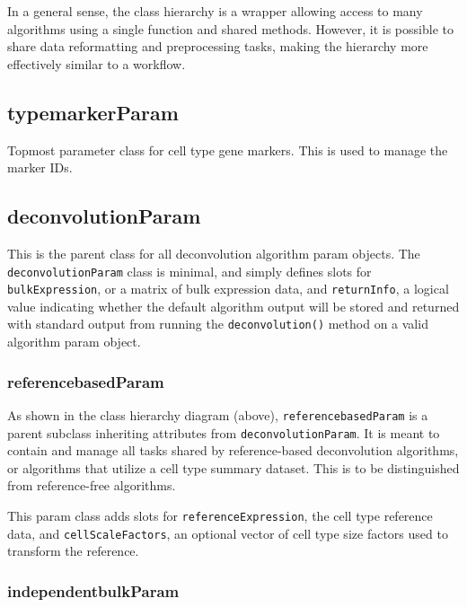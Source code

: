 \documentclass[]{article}
\begin{document}
In a general sense, the class hierarchy is a wrapper allowing access to many
algorithms using a single function and shared methods. However, it is possible
to share data reformatting and preprocessing tasks, making the hierarchy more
effectively similar to a workflow.

\hypertarget{typemarkerparam}{%
\subsection{typemarkerParam}\label{typemarkerparam}}

Topmost parameter class for cell type gene markers. This is used to manage the
marker IDs.

\hypertarget{deconvolutionparam}{%
\subsection{deconvolutionParam}\label{deconvolutionparam}}

This is the parent class for all deconvolution algorithm param objects. The
\texttt{deconvolutionParam} class is minimal, and simply defines slots for
\texttt{bulkExpression}, or a matrix of bulk expression data, and \texttt{returnInfo},
a logical value indicating whether the default algorithm output will be stored
and returned with standard output from running the \texttt{deconvolution()} method on
a valid algorithm param object.

\hypertarget{referencebasedparam}{%
\subsubsection{referencebasedParam}\label{referencebasedparam}}

As shown in the class hierarchy diagram (above), \texttt{referencebasedParam} is a
parent subclass inheriting attributes from \texttt{deconvolutionParam}. It is meant to
contain and manage all tasks shared by reference-based deconvolution algorithms,
or algorithms that utilize a cell type summary dataset. This is to be
distinguished from reference-free algorithms.

This param class adds slots for \texttt{referenceExpression}, the cell type reference
data, and \texttt{cellScaleFactors}, an optional vector of cell type size factors used
to transform the reference.

\hypertarget{independentbulkparam}{%
\subsubsection{independentbulkParam}\label{independentbulkparam}}
\end{document}
